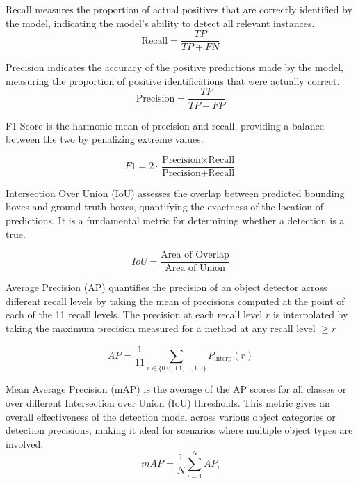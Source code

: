 Recall \cite{metrics} measures the proportion of actual positives that are correctly identified by the model, indicating the model’s ability to detect all relevant instances.
\begin{equation}
    \text{Recall} = \frac{TP}{TP + FN} \tag{16}
\end{equation}


Precision \cite{metrics} indicates the accuracy of the positive predictions made by the model, measuring the proportion of positive identifications that were actually correct.
\begin{equation}
    \text{Precision} = \frac{TP}{TP + FP} \tag{17}
\end{equation}

F1-Score \cite{metrics} is the harmonic mean of precision and recall, providing a balance between the two by penalizing extreme values.

\begin{equation}
    F1 = 2 \cdot \frac{\text{Precision} \times \text{Recall}}{\text{Precision} + \text{Recall}} \tag{18}
\end{equation}


Intersection Over Union (IoU) \cite{metrics} assesses the overlap between predicted bounding boxes and ground truth boxes, quantifying the exactness of the location 
of predictions. It is a fundamental metric for determining whether a detection is a true.

\begin{equation}
    IoU = \frac{\text{Area of Overlap}}{\text{Area of Union}} \tag{19}
\end{equation}


Average Precision (AP) \cite{metrics} quantifies the precision of an object detector across different recall levels by taking the mean of precisions computed 
at the point of each of the 11 recall levels. The precision at each recall level $r$ is interpolated by taking the maximum precision measured 
for a method at any recall level $\geqslant r$

\begin{equation}
    AP = \frac{1}{11} \sum_{r \in \{0.0, 0.1, \ldots, 1.0\}} P_{\text{interp}}(r) \tag{20}
\end{equation}


Mean Average Precision (mAP) \cite{metrics} is the average of the AP scores for all classes or over different Intersection over Union (IoU) thresholds. 
This metric gives an overall effectiveness of the detection model across various object categories or detection precisions, making it ideal for 
scenarios where multiple object types are involved.
\begin{equation}
    mAP = \frac{1}{N} \sum_{i=1}^{N} AP_i \tag{21}
\end{equation}


